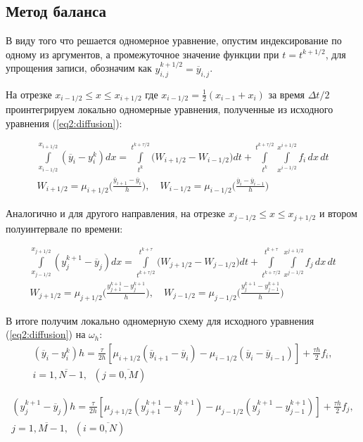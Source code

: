 \subsection{Метод баланса} \label{ssec:balance}

В виду того что решается одномерное уравнение, опустим индексирование по одному из аргументов, а промежуточное значение функции при $t=t^{k+1/2}$, для упрощения записи, обозначим как  $y^{k+1/2}_{i,j} = \overline{y}_{i,j}$.

На отрезке $x_{i-1/2} \leq x \leq x_{i+1/2}$ где $x_{i-1/2} = \frac{1}{2}(x_{i-1} + x_{i})$ за время $\Delta t/2$ проинтегрируем локально одномерные уравнения, полученные из исходного уравнения (\ref{eq2:diffusion}):

\begin{gather}
    \int\limits_{x_{i-1/2}}^{x_{i+1/2}} \left(\overline{y}_{i} - y^{k}_{i}\right)dx = 
    \int\limits_{t^k}^{t^{k+\tau/2}} \Big(W_{i+1/2} - W_{i-1/2}\Big)dt +
    \int\limits_{t^k}^{t^{k+\tau/2}} \int\limits_{x^{i-1/2}}^{x^{i+1/2}} f_{i}\,dx\,dt \\[2pt]
    W_{i+1/2} = \mu_{i+1/2} \bigg( \frac{\overline{y}_{i+1} - \overline{y}_{i}}{h} \bigg) , \quad
	W_{i-1/2} = \mu_{i-1/2} \bigg( \frac{\overline{y}_{i} - \overline{y}_{i-1}}{h} \bigg)  \nonumber
\end{gather}

Аналогично и для другого направления, на отрезке $x_{j-1/2} \leq x \leq x_{j+1/2}$ и втором полуинтервале по времени:

\begin{gather}
    \int\limits_{x_{j-1/2}}^{x_{j+1/2}} \left(y^{k+1}_{j} - \overline{y}_{j}\right)dx = 
    \int\limits_{t^{k+\tau/2}}^{t^{k+\tau}} \Big(W_{j+1/2} - W_{j-1/2}\Big)dt +
    \int\limits_{t^{k+\tau/2}}^{t^{k+\tau}} \int\limits_{x^{j-1/2}}^{x^{j+1/2}} f_{j}\,dx\,dt \\[2pt]
	W_{j+1/2} = \mu_{j+1/2} \bigg( \frac{y^{k+1}_{j+1} - y^{k+1}_{j}}{h} \bigg) , \quad
	W_{j-1/2} = \mu_{j-1/2} \bigg( \frac{y^{k+1}_{j} - y^{k+1}_{j-1}}{h} \bigg) \nonumber
\end{gather}

В итоге получим локально одномерную схему для исходного уравнения (\ref{eq2:diffusion}) на $\omega_{h}$:
\begin{gather} \label{eq2:aprox1}
\left(\overline{y}_{i} - y^{k}_{i}  \right) h = \frac{\tau}{2h} \left[\mu_{i+1/2} \left( \overline{y}_{i+1} - \overline{y}_{i} \right) - \mu_{i-1/2} \left( \overline{y}_{i} - \overline{y}_{i-1} \right)\right] + \frac{\tau h}{2} f_{i},\\
i=\overline{1,N-1}, \;\; (j = \overline{0,M}) \nonumber
\end{gather}

\begin{gather} \label{eq2:aprox2}
    \left(y^{k+1}_{j} - \overline{y}_{j}  \right) h = \frac{\tau}{2h} \left[\mu_{j+1/2} \left( y^{k+1}_{j+1} - y^{k+1}_{j} \right) - \mu_{j-1/2} \left( y^{k+1}_{j} - y^{k+1}_{j-1} \right)\right] + \frac{\tau h}{2} f_{j},\\
    j = \overline{1,M-1}, \;\; (i=\overline{0,N}) \nonumber
\end{gather}